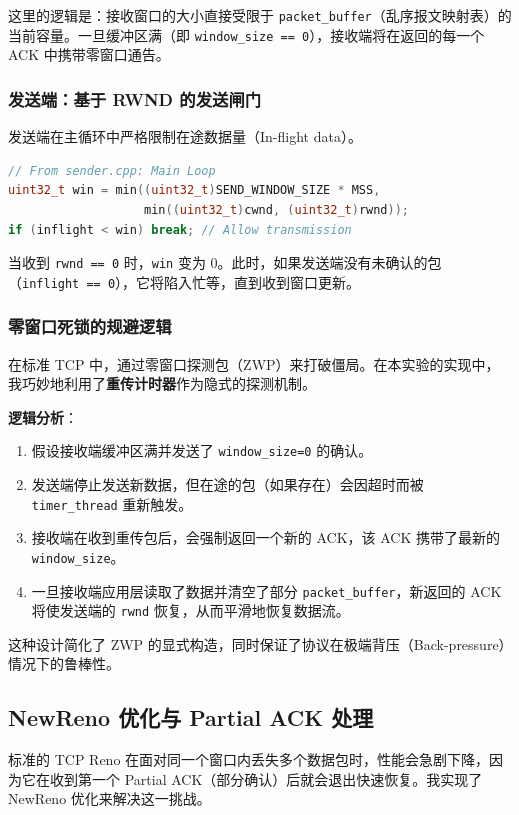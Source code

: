 \documentclass[UTF8,a4paper,10pt]{ctexart}
\begin{document}
这里的逻辑是：接收窗口的大小直接受限于 \texttt{packet\_buffer}（乱序报文映射表）的当前容量。一旦缓冲区满（即 \texttt{window\_size == 0}），接收端将在返回的每一个 ACK 中携带零窗口通告。

\subsubsection{发送端：基于 RWND 的发送闸门}
发送端在主循环中严格限制在途数据量（In-flight data）。

\begin{lstlisting}[language=C++]
// From sender.cpp: Main Loop
uint32_t win = min((uint32_t)SEND_WINDOW_SIZE * MSS, 
                   min((uint32_t)cwnd, (uint32_t)rwnd));
if (inflight < win) break; // Allow transmission
\end{lstlisting}

当收到 \texttt{rwnd == 0} 时，\texttt{win} 变为 0。此时，如果发送端没有未确认的包（\texttt{inflight == 0}），它将陷入忙等，直到收到窗口更新。

\subsubsection{零窗口死锁的规避逻辑}
在标准 TCP 中，通过零窗口探测包（ZWP）来打破僵局。在本实验的实现中，我巧妙地利用了\textbf{重传计时器}作为隐式的探测机制。

\textbf{逻辑分析}：
\begin{enumerate}
    \item 假设接收端缓冲区满并发送了 \texttt{window\_size=0} 的确认。
    \item 发送端停止发送新数据，但在途的包（如果存在）会因超时而被 \texttt{timer\_thread} 重新触发。
    \item 接收端在收到重传包后，会强制返回一个新的 ACK，该 ACK 携带了最新的 \texttt{window\_size}。
    \item 一旦接收端应用层读取了数据并清空了部分 \texttt{packet\_buffer}，新返回的 ACK 将使发送端的 \texttt{rwnd} 恢复，从而平滑地恢复数据流。
\end{enumerate}
这种设计简化了 ZWP 的显式构造，同时保证了协议在极端背压（Back-pressure）情况下的鲁棒性。

\subsection{NewReno 优化与 Partial ACK 处理}

标准的 TCP Reno 在面对同一个窗口内丢失多个数据包时，性能会急剧下降，因为它在收到第一个 Partial ACK（部分确认）后就会退出快速恢复。我实现了 NewReno 优化来解决这一挑战。
\end{document}
